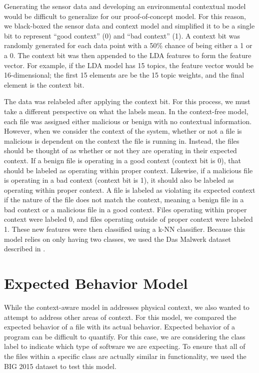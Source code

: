 \documentclass[../stegner_thesis.tex]{subfiles}
\begin{document}
\par Generating the sensor data and developing an environmental contextual
model would be difficult to generalize for our proof-of-concept model.
For this reason, we black-boxed the sensor data and context model and
simplified it to be a single bit to represent ``good context'' (0) and ``bad
context'' (1).
A context bit was randomly generated for each data point with a 50\% chance of
being either a 1 or a 0.
The context bit was then appended to the LDA features to form the feature
vector.
For example, if the LDA model has 15 topics, the feature vector would be
16-dimensional; the first 15 elements are be the 15 topic weights, and the
final element is the context bit.

\par The data was relabeled after applying the context bit.
For this process, we must take a different perspective on what the labels mean.
In the context-free model, each file was assigned either malicious or benign
with no contextual information.
However, when we consider the context of the system, whether or not a file is
malicious is dependent on the context the file is running in.
Instead, the files should be thought of as whether or not they are operating in
their expected context.
If a benign file is operating in a good context (context bit is 0), that should
be labeled as operating within proper context.
Likewise, if a malicious file is operating in a bad context (context bit is 1),
it should also be labeled as operating within proper context.
A file is labeled as violating its expected context if the nature of the file
does not match the context, meaning a benign file in a bad context or a
malicious file in a good context.
Files operating within proper context were labeled 0, and files operating
outside of proper context were labeled 1.
These new features were then classified using a k-NN classifier.
Because this model relies on only having two classes, we used the Das Malwerk
dataset described in .

\section{Expected Behavior Model}%
\label{sec:mthd_expected_behavior}

\par While the context-aware model in  addresses
physical context, we also wanted to attempt to address other areas of context.
For this model, we compared the expected behavior of a file with its actual
behavior.
Expected behavior of a program can be difficult to quantify.
For this case, we are considering the class label to indicate which type of
software we are expecting.
To ensure that all of the files within a specific class are actually similar in
functionality, we used the BIG 2015 dataset to test this model.
\end{document}
